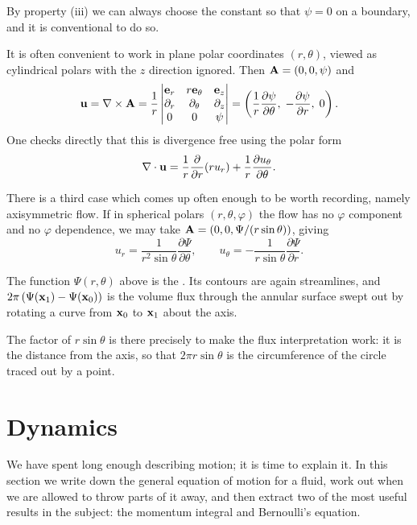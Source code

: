 \documentclass[a4paper]{scrartcl}
\newcommand{\pd}[2]{\frac{\partial #1}{\partial #2}}
\begin{document}
By property (iii) we can always choose the constant so that $\psi = 0$ on a boundary, and it is conventional to do so.

It is often convenient to work in plane polar coordinates $(r, \theta)$, viewed as cylindrical polars with the $z$ direction ignored. Then $\mathbf{A} = (0, 0, \psi)$ and
$$
\vv u = \nabla \times \vv A = \frac{1}{r}\begin{vmatrix} \vv e_r & r\vv e_\theta & \vv e_z \\ \partial_r & \partial_\theta & \partial_z \\ 0 & 0 & \psi \end{vmatrix} = \left(\frac{1}{r}\pd{\psi}{\theta}, \; -\pd{\psi}{r}, \; 0\right).
$$
One checks directly that this is divergence free using the polar form
$$
\nabla \cdot \vv u = \frac{1}{r}\pd{}{r}(r u_r) + \frac{1}{r}\pd{u_\theta}{\theta}.
$$

There is a third case which comes up often enough to be worth recording, namely axisymmetric flow. If in spherical polars $(r, \theta, \varphi)$ the flow has no $\varphi$ component and no $\varphi$ dependence, we may take $\mathbf{A} = \left(0, 0, \Psi/(r\sin\theta)\right)$, giving
$$
u_r = \frac{1}{r^2 \sin\theta}\pd{\Psi}{\theta}, \qquad u_\theta = -\frac{1}{r\sin\theta}\pd{\Psi}{r}.
$$

\begin{definition}
	The function $\Psi(r, \theta)$ above is the . Its contours are again streamlines, and $2\pi\left(\Psi(\mathbf{x}_1) - \Psi(\mathbf{x}_0)\right)$ is the volume flux through the annular surface swept out by rotating a curve from $\mathbf{x}_0$ to $\mathbf{x}_1$ about the axis.
\end{definition}

The factor of $r\sin\theta$ is there precisely to make the flux interpretation work: it is the distance from the axis, so that $2\pi r \sin\theta$ is the circumference of the circle traced out by a point.

\section{Dynamics}

We have spent long enough describing motion; it is time to explain it. In this section we write down the general equation of motion for a fluid, work out when we are allowed to throw parts of it away, and then extract two of the most useful results in the subject: the momentum integral and Bernoulli's equation.
\end{document}
